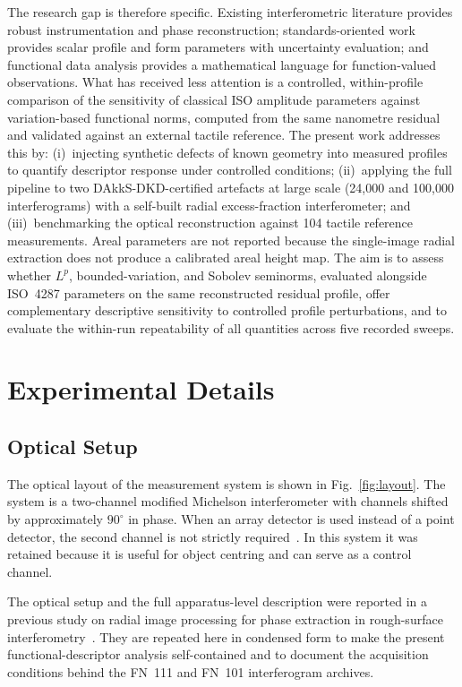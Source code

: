 \documentclass[review]{elsarticle}
\begin{document}
The research gap is therefore specific. Existing interferometric literature provides robust instrumentation and phase reconstruction; standards-oriented work provides scalar profile and form parameters with uncertainty evaluation; and functional data analysis provides a mathematical language for function-valued observations. What has received less attention is a controlled, within-profile comparison of the sensitivity of classical ISO amplitude parameters against variation-based functional norms, computed from the same nanometre residual and validated against an external tactile reference. The present work addresses this by: (i)~injecting synthetic defects of known geometry into measured profiles to quantify descriptor response under controlled conditions; (ii)~applying the full pipeline to two DAkkS-DKD-certified artefacts at large scale (24,000 and 100,000 interferograms) with a self-built radial excess-fraction interferometer; and (iii)~benchmarking the optical reconstruction against 104 tactile reference measurements. Areal parameters are not reported because the single-image radial extraction does not produce a calibrated areal height map. The aim is to assess whether $L^p$, bounded-variation, and Sobolev seminorms, evaluated alongside ISO~4287 parameters on the same reconstructed residual profile, offer complementary descriptive sensitivity to controlled profile perturbations, and to evaluate the within-run repeatability of all quantities across five recorded sweeps.

\section{Experimental Details}

\subsection{Optical Setup}
The optical layout of the measurement system is shown in Fig.~\ref{fig:layout}. The system is a two-channel modified Michelson interferometer with channels shifted by approximately $90^\circ$ in phase. When an array detector is used instead of a point detector, the second channel is not strictly required~\cite{Meijer2018a}. In this system it was retained because it is useful for object centring and can serve as a control channel.

The optical setup and the full apparatus-level description were reported in a previous study on radial image processing for phase extraction in rough-surface interferometry~\cite{kucharski2025radial-0ca}. They are repeated here in condensed form to make the present functional-descriptor analysis self-contained and to document the acquisition conditions behind the FN~111 and FN~101 interferogram archives.
\end{document}
